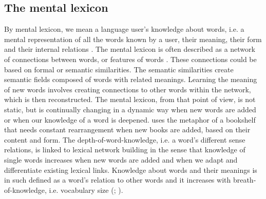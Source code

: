 \documentclass[output=paper,colorlinks,citecolor=brown,nonflat]{langsci/langscibook}
\begin{document}
\subsection{The mental lexicon}\label{sec:gudmundson:1.1}

By mental lexicon, we mean a language user’s knowledge about words, i.e. a mental representation of all the words known by a user, their meaning, their form and their internal relations \citep{Aitchison2012}. The mental lexicon is often described as a network of connections between words, or features of words \citep{Aitchison2012}. These connections could be based on formal or semantic similarities. The semantic similarities create semantic fields composed of words with related meanings. Learning the meaning of new words involves creating connections to other words within the network, which is then reconstructed. The mental lexicon, from that point of view, is not static, but is continually changing in a dynamic way when new words are added or when our knowledge of a word is deepened. \citet[209-210]{Aitchison2012} uses the metaphor of a bookshelf that needs constant rearrangement when new books are added, based on their content and form. The depth-of-word-knowledge, i.e. a word’s different sense relations, is linked to lexical network building in the sense that knowledge of single words increases when new words are added and when we adapt and differentiate existing lexical links. Knowledge about words and their meanings is in such defined as a word’s relation to other words and it increases with breath-of-knowledge, i.e. vocabulary size (\citealt[222]{HaastrupHenriksen2000}; \citealt{Nation2001, Read2004}).
\end{document}
